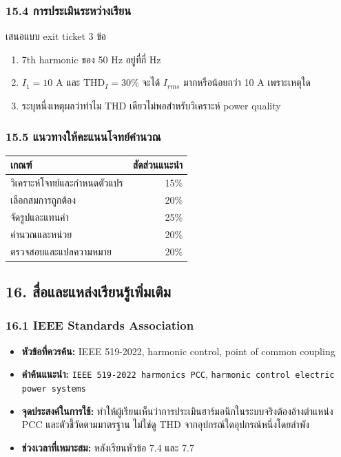 \subsubsection{15.4 การประเมินระหว่างเรียน}

เสนอแบบ exit ticket 3 ข้อ

\begin{enumerate}
    \item 7th harmonic ของ 50 Hz อยู่ที่กี่ Hz
    \item $I_1=10$ A และ THD$_I=30\%$ จะได้ $I_{rms}$ มากหรือน้อยกว่า 10 A เพราะเหตุใด
    \item ระบุหนึ่งเหตุผลว่าทำไม THD เดียวไม่พอสำหรับวิเคราะห์ power quality
\end{enumerate}

\subsubsection{15.5 แนวทางให้คะแนนโจทย์คำนวณ}

\begin{table}[htbp]
    \centering
    \begin{tabular}{l r}
        \hline
        \textbf{เกณฑ์} & \textbf{สัดส่วนแนะนำ} \\
        \hline
        วิเคราะห์โจทย์และกำหนดตัวแปร & 15\% \\
        เลือกสมการถูกต้อง & 20\% \\
        จัดรูปและแทนค่า & 25\% \\
        คำนวณและหน่วย & 20\% \\
        ตรวจสอบและแปลความหมาย & 20\% \\
        \hline
    \end{tabular}
\end{table}



\subsection{16. สื่อและแหล่งเรียนรู้เพิ่มเติม}

\subsubsection{16.1 IEEE Standards Association}

\begin{itemize}
    \item \textbf{หัวข้อที่ควรค้น:} IEEE 519-2022, harmonic control, point of common coupling
    \item \textbf{คำค้นแนะนำ:} \texttt{IEEE 519-2022 harmonics PCC}, \texttt{harmonic control electric power systems}
    \item \textbf{จุดประสงค์ในการใช้:} ทำให้ผู้เรียนเห็นว่าการประเมินฮาร์มอนิกในระบบจริงต้องอ้างตำแหน่ง PCC และตัวชี้วัดตามมาตรฐาน ไม่ใช่ดู THD จากอุปกรณ์ใดอุปกรณ์หนึ่งโดยลำพัง
    \item \textbf{ช่วงเวลาที่เหมาะสม:} หลังเรียนหัวข้อ 7.4 และ 7.7
\end{itemize}

